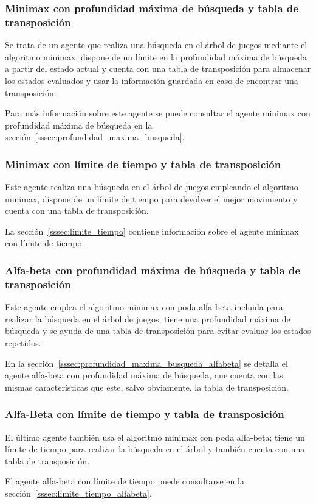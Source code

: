 \subsubsection{Minimax con profundidad máxima de búsqueda y tabla de transposición}
\label{sssec:minimax_profmax_tablatransposicion}
Se trata de un agente que realiza una búsqueda en el árbol de juegos mediante el algoritmo minimax, dispone de un límite en la profundidad máxima de búsqueda a partir del estado actual y cuenta con una tabla de transposición para almacenar los estados evaluados y usar la información guardada en caso de encontrar una transposición.

Para más información sobre este agente se puede consultar el agente minimax con profundidad máxima de búsqueda en la sección~\ref{sssec:profundidad_maxima_busqueda}.

\subsubsection{Minimax con límite de tiempo y tabla de transposición}
\label{sssec:minimax_limiteTiempo_tablatransposicion}
Este agente realiza una búsqueda en el árbol de juegos empleando el algoritmo minimax, dispone de un límite de tiempo para devolver el mejor movimiento y cuenta con una tabla de transposición.

La sección~\ref{sssec:limite_tiempo} contiene información sobre el agente minimax con límite de tiempo.

\subsubsection{Alfa-beta con profundidad máxima de búsqueda y tabla de transposición}
\label{sssec:alfabeta_profmax_tablatransposicion}
Este agente emplea el algoritmo minimax con poda alfa-beta incluida para realizar la búsqueda en el árbol de juegos; tiene una profundidad máxima de búsqueda y se ayuda de una tabla de transposición para evitar evaluar los estados repetidos.

En la sección~\ref{sssec:profundidad_maxima_busqueda_alfabeta} se detalla el agente alfa-beta con profundidad máxima de búsqueda, que cuenta con las mismas características que este, salvo obviamente, la tabla de transposición.

\subsubsection{Alfa-Beta con límite de tiempo y tabla de transposición}
\label{sssec:alfabeta_limiteTiempo_tablatransposicion}
El último agente también usa el algoritmo minimax con poda alfa-beta; tiene un límite de tiempo para realizar la búsqueda en el árbol y también cuenta con una tabla de transposición.

El agente alfa-beta con límite de tiempo puede consultarse en la sección~\ref{sssec:limite_tiempo_alfabeta}.